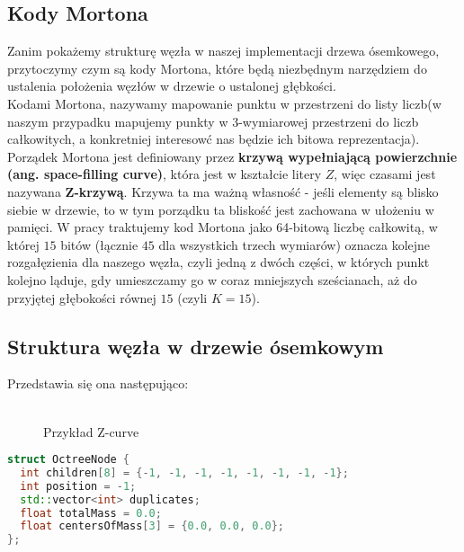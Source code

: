 \documentclass[14pt,twoside,a4paper]{article}
\theoremstyle{definition}
\begin{document}
\subsection{\Large Kody Mortona}
Zanim pokażemy strukturę węzła w naszej implementacji drzewa ósemkowego, przytoczymy czym są kody Mortona, które będą niezbędnym narzędziem do ustalenia położenia węzłów w drzewie o ustalonej głębkości.\\
\bigskip
Kodami Mortona, nazywamy mapowanie punktu w przestrzeni do listy liczb(w naszym przypadku mapujemy punkty w 3-wymiarowej przestrzeni do liczb całkowitych, a konkretniej interesowć nas będzie ich bitowa reprezentacja).
Porządek Mortona jest definiowany przez \textbf{krzywą wypełniającą powierzchnie (ang. space-filling curve)}, która jest w kształcie litery $Z$, więc czasami jest nazywana \textbf{Z-krzywą}. Krzywa ta ma ważną własność - jeśli elementy są blisko siebie w drzewie, to w tym porządku ta bliskość jest zachowana w ułożeniu w pamięci. W pracy traktujemy kod Mortona jako 64-bitową liczbę całkowitą, w której $15$ bitów (łącznie $45$ dla wszystkich trzech wymiarów) oznacza kolejne rozgałęzienia dla naszego węzła, czyli jedną z dwóch części, w których punkt kolejno ląduje, gdy umieszczamy go w coraz mniejszych sześcianach, aż do przyjętej głębokości równej $15$ (czyli $K = 15$).
\bigskip
\subsection{\Large Struktura węzła w drzewie ósemkowym}
Przedstawia się ona następująco: \\~\\

\begin{figure}[h]
    \centering      
    \def\svgscale{0.53}
    
    \caption{Przykład Z-curve}
    \label{fig:krzywa}
\end{figure}

\begin{lstlisting}[language=C++, frame=single, framerule=2pt, caption=Struktura OctreeNode]
struct OctreeNode {
  int children[8] = {-1, -1, -1, -1, -1, -1, -1, -1};
  int position = -1;
  std::vector<int> duplicates;
  float totalMass = 0.0;
  float centersOfMass[3] = {0.0, 0.0, 0.0};
};
\end{lstlisting}
\end{document}
